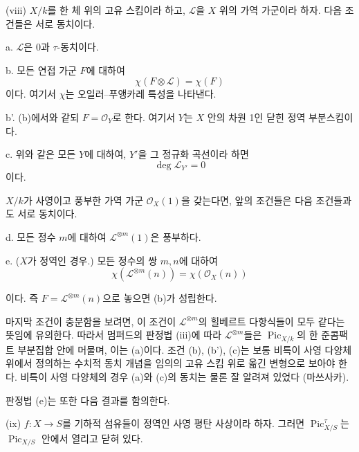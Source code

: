 \medskip
\noindent(viii) $X/k$를 한 체 위의 고유 스킴이라 하고, $\mathcal L$을
$X$ 위의 가역 가군이라 하자. 다음 조건들은 서로 동치이다.

\noindent a. $\mathcal L$은 $0$과 $\tau$-동치이다.

\noindent b. 모든 연접 가군 $F$에 대하여
\[
\chi(F\otimes\mathcal L)=\chi(F)
\]
이다. 여기서 $\chi$는 오일러--푸앵카레 특성을 나타낸다.

\noindent b'. (b)에서와 같되 $F=\mathcal O_Y$로 한다. 여기서 $Y$는
$X$ 안의 차원 1인 닫힌 정역 부분스킴이다.

\noindent c. 위와 같은 모든 $Y$에 대하여, $Y'$을 그 정규화 곡선이라
하면
\[
\deg\mathcal L_{Y'}=0
\]
이다.

$X/k$가 사영이고 풍부한 가역 가군 $\mathcal O_X(1)$을 갖는다면, 앞의
조건들은 다음 조건들과도 서로 동치이다.

\noindent d. 모든 정수 $m$에 대하여 $\mathcal L^{\otimes m}(1)$은
풍부하다.

\noindent e. ($X$가 정역인 경우.) 모든 정수의 쌍 $m,n$에 대하여
\[
\chi(\mathcal L^{\otimes m}(n))=\chi(\mathcal O_X(n))
\]

이다. 즉 $F=\mathcal L^{\otimes m}(n)$으로 놓으면 (b)가 성립한다.

마지막 조건이 충분함을 보려면, 이 조건이 $\mathcal L^{\otimes m}$의
힐베르트 다항식들이 모두 같다는 뜻임에 유의한다. 따라서 멈퍼드의 판정법
(iii)에 따라 $\mathcal L^{\otimes m}$들은
$\operatorname{Pic}_{X/k}$의 한 준콤팩트 부분집합 안에 머물며, 이는
(a)이다. 조건 (b), (b'), (c)는 보통 비특이 사영 다양체 위에서 정의하는
수치적 동치 개념을 임의의 고유 스킴 위로 옮긴 변형으로 보아야 한다.
비특이 사영 다양체의 경우 (a)와 (c)의 동치는 물론 잘 알려져 있었다
(마쓰사카).

판정법 (e)는 또한 다음 결과를 함의한다.

\medskip
\noindent(ix) $f:X\longrightarrow S$를 기하적 섬유들이 정역인 사영
평탄 사상이라 하자. 그러면 $\operatorname{Pic}_{X/S}^\tau$는
$\operatorname{Pic}_{X/S}$ 안에서 열리고 닫혀 있다.


